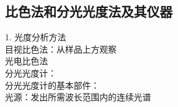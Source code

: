 \documentclass[utf8,a4paper,12pt]{ctexart}
\begin{document}
\subsection{比色法和分光光度法及其仪器}
1. 光度分析方法\\
目视比色法：从样品上方观察\\
光电比色法\\
分光光度计：\\
分光光度计的基本部件：\\
光源：发出所需波长范围内的连续光谱\\
\end{document}
